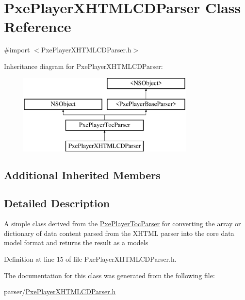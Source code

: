 \hypertarget{interface_pxe_player_x_h_t_m_l_c_d_parser}{\section{Pxe\-Player\-X\-H\-T\-M\-L\-C\-D\-Parser Class Reference}
\label{interface_pxe_player_x_h_t_m_l_c_d_parser}
}


{\ttfamily \#import $<$Pxe\-Player\-X\-H\-T\-M\-L\-C\-D\-Parser.\-h$>$}

Inheritance diagram for Pxe\-Player\-X\-H\-T\-M\-L\-C\-D\-Parser\-:\begin{figure}[H]
\begin{center}
\leavevmode
\includegraphics[height=4.000000cm]{interface_pxe_player_x_h_t_m_l_c_d_parser}
\end{center}
\end{figure}
\subsection*{Additional Inherited Members}


\subsection{Detailed Description}
A simple class derived from the \hyperlink{interface_pxe_player_toc_parser}{Pxe\-Player\-Toc\-Parser} for converting the array or dictionary of data content parsed from the X\-H\-T\-M\-L parser into the core data model format and returns the result as a models 

Definition at line 15 of file Pxe\-Player\-X\-H\-T\-M\-L\-C\-D\-Parser.\-h.



The documentation for this class was generated from the following file\-:\begin{DoxyCompactItemize}
\item 
parser/\hyperlink{_pxe_player_x_h_t_m_l_c_d_parser_8h}{Pxe\-Player\-X\-H\-T\-M\-L\-C\-D\-Parser.\-h}\end{DoxyCompactItemize}
